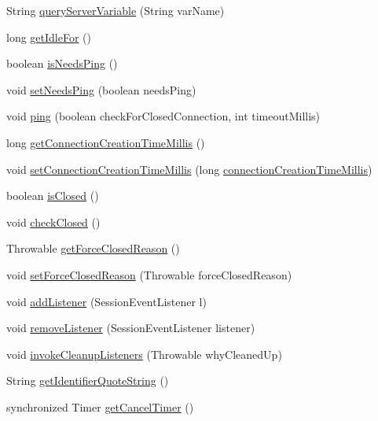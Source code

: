 \begin{DoxyCompactItemize}
\item 
String \mbox{\hyperlink{classcom_1_1mysql_1_1cj_1_1_native_session_ad2b81db7dba2a2a485e2a2063599863a}{query\+Server\+Variable}} (String var\+Name)
\item 
long \mbox{\hyperlink{classcom_1_1mysql_1_1cj_1_1_native_session_acf4df7ee75428b73f8a04fad9ec79cd5}{get\+Idle\+For}} ()
\item 
boolean \mbox{\hyperlink{classcom_1_1mysql_1_1cj_1_1_native_session_aa854ea4478e9d363583300405526c67f}{is\+Needs\+Ping}} ()
\item 
void \mbox{\hyperlink{classcom_1_1mysql_1_1cj_1_1_native_session_abb7a8cffc568444d73d5009376cac2ac}{set\+Needs\+Ping}} (boolean needs\+Ping)
\item 
void \mbox{\hyperlink{classcom_1_1mysql_1_1cj_1_1_native_session_a374846a5074ddfa646ee9a632cbb229a}{ping}} (boolean check\+For\+Closed\+Connection, int timeout\+Millis)
\item 
long \mbox{\hyperlink{classcom_1_1mysql_1_1cj_1_1_native_session_a82035d07982c3fb563055e2711cb395b}{get\+Connection\+Creation\+Time\+Millis}} ()
\item 
void \mbox{\hyperlink{classcom_1_1mysql_1_1cj_1_1_native_session_acdf7ae6fddc0c35f16946cbd017151f8}{set\+Connection\+Creation\+Time\+Millis}} (long \mbox{\hyperlink{classcom_1_1mysql_1_1cj_1_1_core_session_afe99c9d8a829f985f424087e61f4cad6}{connection\+Creation\+Time\+Millis}})
\item 
boolean \mbox{\hyperlink{classcom_1_1mysql_1_1cj_1_1_native_session_a41c503c26623fb7da3cd6a8e854247f8}{is\+Closed}} ()
\item 
void \mbox{\hyperlink{classcom_1_1mysql_1_1cj_1_1_native_session_a7b560452deaadf256bcefc6ee497f006}{check\+Closed}} ()
\item 
Throwable \mbox{\hyperlink{classcom_1_1mysql_1_1cj_1_1_native_session_ac3798e124e39f98030b01c3201e2d281}{get\+Force\+Closed\+Reason}} ()
\item 
void \mbox{\hyperlink{classcom_1_1mysql_1_1cj_1_1_native_session_a8c13be2c7c755a6e054c1779d0f9aea9}{set\+Force\+Closed\+Reason}} (Throwable force\+Closed\+Reason)
\item 
void \mbox{\hyperlink{classcom_1_1mysql_1_1cj_1_1_native_session_af9c9459689e10e1f44ef81395080bc36}{add\+Listener}} (Session\+Event\+Listener l)
\item 
void \mbox{\hyperlink{classcom_1_1mysql_1_1cj_1_1_native_session_a757e9719da6f9e70c29c990ce7e0267a}{remove\+Listener}} (Session\+Event\+Listener listener)
\item 
void \mbox{\hyperlink{classcom_1_1mysql_1_1cj_1_1_native_session_a78a3b77cb0addf3900c509222a527c42}{invoke\+Cleanup\+Listeners}} (Throwable why\+Cleaned\+Up)
\item 
String \mbox{\hyperlink{classcom_1_1mysql_1_1cj_1_1_native_session_af85c1c114ea3ef2ab2d588cd178512cf}{get\+Identifier\+Quote\+String}} ()
\item 
synchronized Timer \mbox{\hyperlink{classcom_1_1mysql_1_1cj_1_1_native_session_a21f772a2e61b6ec36e136b894ea22d95}{get\+Cancel\+Timer}} ()
\end{DoxyCompactItemize}

